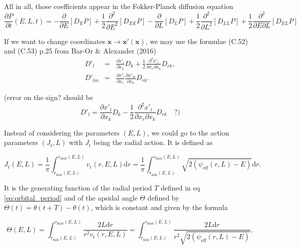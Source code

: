 \documentclass[11pt]{article}
\newcommand{\rr}{\mathrm{r}}
\newcommand{\vr}{v_{\rr}}
\newcommand{\rd}{{\mathrm{d}}}
\newcommand{\dE}{D_{E}}
\newcommand{\dL}{D_{L}}
\newcommand{\dEE}{D_{EE}}
\newcommand{\dLL}{D_{LL}}
\newcommand{\dEL}{D_{EL}}
\newcommand{\rmax}{r_{\max}}
\newcommand{\rmin}{r_{\min}}
\newcommand{\psieff}{\psi_{\mathrm{eff}}}
\newcommand{\bx}{\boldsymbol{x}}
\newcommand{\xp}{x'}
\newcommand{\bxp}{\boldsymbol{\xp}}
\newcommand{\Jr}{J_{\mathrm{r}}}
\begin{document}
All in all, those coefficients appear in the Fokker-Planck diffusion
equation
\begin{equation}
\frac{\partial P}{\partial t}(E,L,t)=-\frac{\partial}{\partial E}\left[\dE P\right]+\frac{1}{2}\frac{\partial^{2}}{\partial E^{2}}\left[\dEE P\right]-\frac{\partial}{\partial L}\left[\dL P\right]+\frac{1}{2}\frac{\partial^{2}}{\partial L^{2}}\left[\dLL P\right]+\frac{1}{2}\frac{\partial^{2}}{\partial E\partial L}\left[\dEL P\right]
\label{eq:FP:equation}
\end{equation}

If we want to change coordinates $\bx\rightarrow\bxp(\bx)$,
we may use the formulae (C.52) and (C.53) p.25 from Bar-Or \& Alexander
(2016)
\begin{equation}
\begin{array}{ccl}
  D'_{l} & =& \displaystyle{\frac{\partial \xp_{l}}{\partial x_{k}}D_{k}+\frac{1}{2}\frac{\partial^{2}\xp_{l}}{\partial x_{r}\partial x_{k}}D_{rk}} ,\\
  
 D'_{lm} & =&\displaystyle{\frac{\partial \xp_{l}}{\partial x_{r}}\frac{\partial \xp_{m}}{\partial x_{k}}D_{rk}} .
\end{array}
\label{eq:change_var_DiffCoeffs}
\end{equation}


(error on the sign? should be
\[
D'_{l}=\frac{\partial \xp_{l}}{\partial x_{k}}D_{k}-\frac{1}{2}\frac{\partial^{2}\xp_{l}}{\partial x_{r}\partial x_{k}}D_{rk}\quad?)
\]

Instead of considering the parameters $(E,L)$, we could go to the action parameters $(\Jr,L)$ with $\Jr$ being the radial action. It is defined as

\begin{equation}
  \Jr(E,L) = \frac{1}{\pi} \int_{\rmin(E,L)}^{\rmax(E,L)}\vr(r,E,L)\rd r =  \frac{1}{\pi} \int_{\rmin(E,L)}^{\rmax(E,L)} \sqrt{2(\psieff(r,L)-E)}\rd r.
  \label{eq:Radial_action}
  \end{equation}

It is the generating function of the radial period $T$ defined in eq \eqref{eq:orbital_period} and of the apsidal angle $\Theta$ defined by  $\Theta(t)=\theta(t+T)-\theta(t)$, which is constant and given by the formula

\begin{equation}
  \Theta(E,L)=   \int_{\rmin(E,L)}^{\rmax(E,L)} \frac{2 L \rd r}{r^{2}\vr(r,E,L)} =   \int_{\rmin(E,L)}^{\rmax(E,L)} \frac{2 L \rd r}{r^{2}\sqrt{2(\psieff(r,L)-E)}}, 
  \label{eq:Apsidal_angle}
\end{equation}
\end{document}
